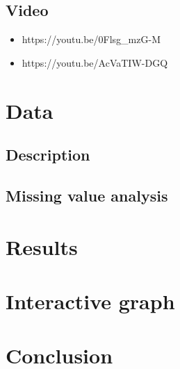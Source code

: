 \documentclass[
  letterpaper,
]{book}
\providecommand{\tightlist}{%
  \setlength{\itemsep}{0pt}\setlength{\parskip}{0pt}}\usepackage{longtable,booktabs,array}
\begin{document}
\section{Video}\label{video}

\begin{itemize}
\tightlist
\item
  https://youtu.be/0Flsg\_mzG-M
\item
  https://youtu.be/AcVaTIW-DGQ
\end{itemize}


\chapter{Data}\label{data}

\section{Description}\label{description}

\section{Missing value analysis}\label{missing-value-analysis}


\chapter{Results}\label{results}


\chapter{Interactive graph}\label{interactive-graph}

\label{plot}


\chapter{Conclusion}\label{conclusion}


\backmatter

\printindex
\end{document}

